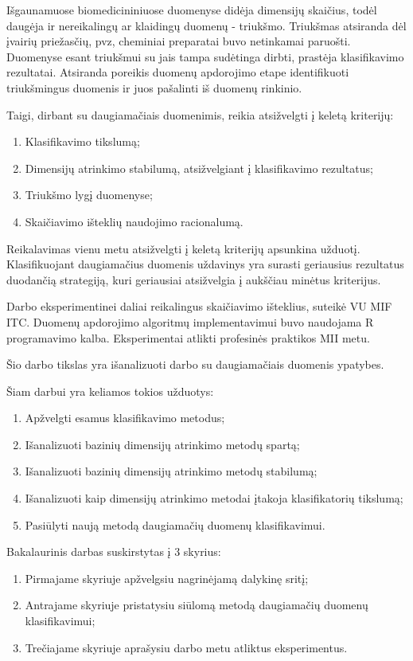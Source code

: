 
Išgaunamuose biomedicininiuose duomenyse didėja dimensijų skaičius, todėl 
daugėja ir nereikalingų ar klaidingų duomenų - triukšmo. Triukšmas atsiranda
dėl įvairių priežasčių, pvz, cheminiai preparatai buvo netinkamai paruošti. 
Duomenyse esant triukšmui su jais tampa sudėtinga dirbti, prastėja klasifikavimo
rezultatai. Atsiranda poreikis duomenų apdorojimo etape identifikuoti 
triukšmingus duomenis ir juos pašalinti iš duomenų rinkinio.

Taigi, dirbant su daugiamačiais duomenimis, reikia atsižvelgti į keletą 
kriterijų:
\begin{enumerate}
 \item Klasifikavimo tikslumą;
 \item Dimensijų atrinkimo stabilumą, atsižvelgiant į klasifikavimo rezultatus;
 \item Triukšmo lygį duomenyse;
 \item Skaičiavimo išteklių naudojimo racionalumą.
\end{enumerate}
Reikalavimas vienu metu atsižvelgti į keletą kriterijų apsunkina užduotį.
Klasifikuojant daugiamačius duomenis uždavinys yra surasti geriausius 
rezultatus duodančią strategiją, kuri geriausiai atsižvelgia į aukščiau minėtus
kriterijus.

Darbo eksperimentinei daliai reikalingus skaičiavimo išteklius, suteikė VU MIF 
ITC. Duomenų apdorojimo algoritmų implementavimui buvo naudojama R programavimo
kalba. Eksperimentai atlikti profesinės praktikos MII metu.

Šio darbo tikslas yra išanalizuoti darbo su daugiamačiais duomenis ypatybes.

Šiam darbui yra keliamos tokios užduotys:
\begin{enumerate}
 \item Apžvelgti esamus klasifikavimo metodus;
 \item Išanalizuoti bazinių dimensijų atrinkimo metodų spartą;
 \item Išanalizuoti bazinių dimensijų atrinkimo metodų stabilumą;
 \item Išanalizuoti kaip dimensijų atrinkimo metodai įtakoja klasifikatorių
 tikslumą;
 \item Pasiūlyti naują metodą daugiamačių duomenų klasifikavimui.
\end{enumerate}

Bakalaurinis darbas suskirstytas į 3 skyrius:
\begin{enumerate}
 \item Pirmajame skyriuje apžvelgsiu nagrinėjamą dalykinę sritį;
 \item Antrajame skyriuje pristatysiu siūlomą metodą daugiamačių duomenų 
 klasifikavimui;
 \item Trečiajame skyriuje aprašysiu darbo metu atliktus eksperimentus.
\end{enumerate}

